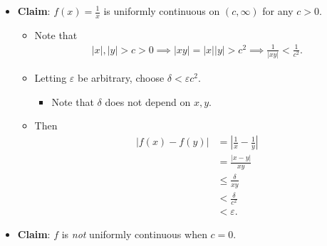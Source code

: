 \begin{solution}

\begin{itemize}
\tightlist
\item
  \textbf{Claim}: \(f(x) = \frac 1 x\) is uniformly continuous on
  \((c, \infty)\) for any \(c > 0\).

  \begin{itemize}
  \item
    Note that
    \begin{align*}
    {\left\lvert {x} \right\rvert}, {\left\lvert {y} \right\rvert} > c > 0 \implies {\left\lvert {xy} \right\rvert} = {\left\lvert {x} \right\rvert}{\left\lvert {y} \right\rvert} > c^2 \implies \frac{1}{{\left\lvert {xy} \right\rvert}} < \frac 1 {c^{2}}
    .\end{align*}
  \item
    Letting \(\varepsilon\) be arbitrary, choose
    \(\delta < \varepsilon c^2\).

    \begin{itemize}
    \tightlist
    \item
      Note that \(\delta\) does not depend on \(x, y\).
    \end{itemize}
  \item
    Then
    \begin{align*}
    {\left\lvert {f(x) - f(y)} \right\rvert}
    &= {\left\lvert {\frac 1 x - \frac 1 y} \right\rvert} \\
    &= \frac{{\left\lvert {x-y} \right\rvert}}{xy} \\
    &\leq \frac{\delta}{xy} \\
    &< \frac{\delta}{c^2} \\
    &< \varepsilon
    .\end{align*}
  \end{itemize}
\item
  \textbf{Claim}: \(f\) is \emph{not} uniformly continuous when \(c=0\).


\end{itemize}
\end{solution}
